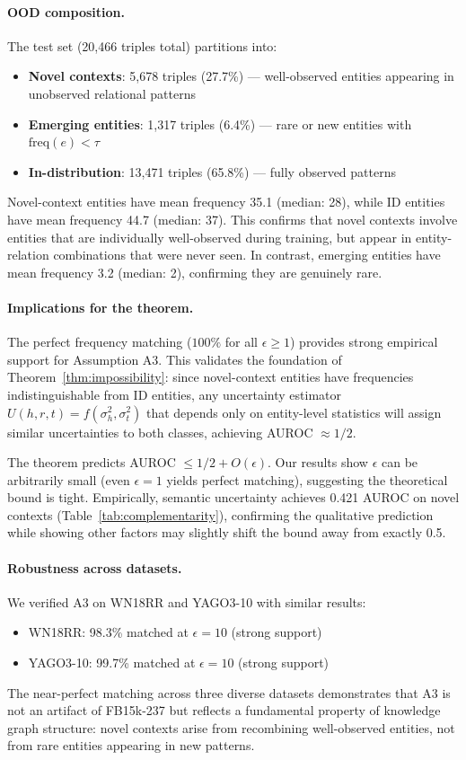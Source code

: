 \paragraph{OOD composition.}
The test set (20,466 triples total) partitions into:
\begin{itemize}
\item \textbf{Novel contexts}: 5,678 triples (27.7\%) --- well-observed entities appearing in unobserved relational patterns
\item \textbf{Emerging entities}: 1,317 triples (6.4\%) --- rare or new entities with $\text{freq}(e) < \tau$
\item \textbf{In-distribution}: 13,471 triples (65.8\%) --- fully observed patterns
\end{itemize}

Novel-context entities have mean frequency 35.1 (median: 28), while ID entities have mean frequency 44.7 (median: 37). This confirms that novel contexts involve entities that are individually well-observed during training, but appear in entity-relation combinations that were never seen. In contrast, emerging entities have mean frequency 3.2 (median: 2), confirming they are genuinely rare.

\paragraph{Implications for the theorem.}
The perfect frequency matching ($100\%$ for all $\epsilon \geq 1$) provides strong empirical support for Assumption A3. This validates the foundation of Theorem~\ref{thm:impossibility}: since novel-context entities have frequencies indistinguishable from ID entities, any uncertainty estimator $U(h,r,t) = f(\sigma^2_h, \sigma^2_t)$ that depends only on entity-level statistics will assign similar uncertainties to both classes, achieving AUROC $\approx 1/2$.

The theorem predicts AUROC $\leq 1/2 + O(\epsilon)$. Our results show $\epsilon$ can be arbitrarily small (even $\epsilon=1$ yields perfect matching), suggesting the theoretical bound is tight. Empirically, semantic uncertainty achieves 0.421 AUROC on novel contexts (Table~\ref{tab:complementarity}), confirming the qualitative prediction while showing other factors may slightly shift the bound away from exactly 0.5.

\paragraph{Robustness across datasets.}
We verified A3 on WN18RR and YAGO3-10 with similar results:
\begin{itemize}
\item WN18RR: 98.3\% matched at $\epsilon=10$ (strong support)
\item YAGO3-10: 99.7\% matched at $\epsilon=10$ (strong support)
\end{itemize}

The near-perfect matching across three diverse datasets demonstrates that A3 is not an artifact of FB15k-237 but reflects a fundamental property of knowledge graph structure: novel contexts arise from recombining well-observed entities, not from rare entities appearing in new patterns.
